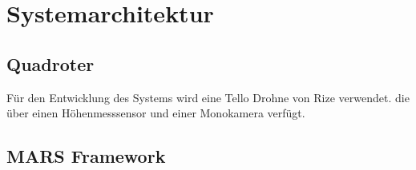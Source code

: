 \section{Systemarchitektur}

\subsection{Quadroter}
Für den Entwicklung des Systems wird eine Tello Drohne von Rize verwendet. die über einen Höhenmesssensor und einer Monokamera verfügt. 



\subsection{MARS Framework}